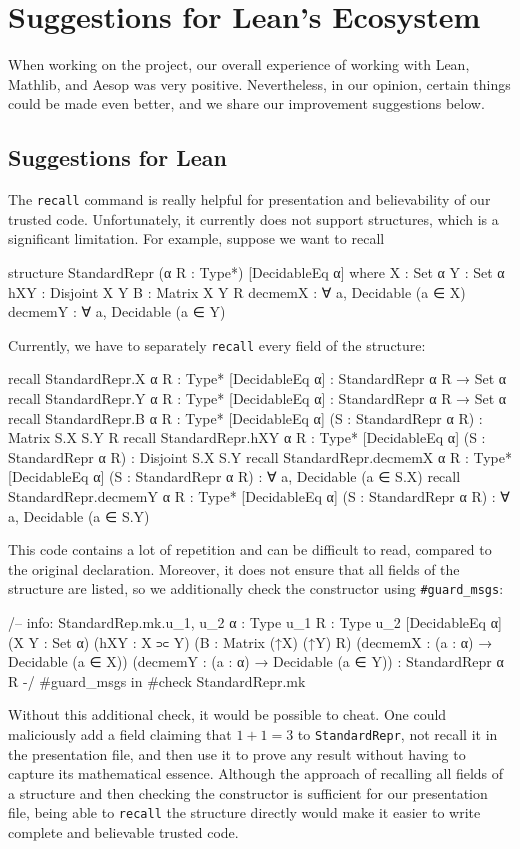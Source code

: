 \section{Suggestions for Lean's Ecosystem}

When working on the project, our overall experience of working with Lean, Mathlib, and Aesop was very positive. Nevertheless, in our opinion, certain things could be made even better, and we share our improvement suggestions below.

\subsection{Suggestions for Lean}

The \texttt{recall} command is really helpful for presentation and believability of our trusted code. Unfortunately, it currently does not support structures, which is a significant limitation. For example, suppose we want to recall
\begin{leancode}
structure StandardRepr (α R : Type*)
    [DecidableEq α] where
  X : Set α
  Y : Set α
  hXY : Disjoint X Y
  B : Matrix X Y R
  decmemX : ∀ a, Decidable (a ∈ X)
  decmemY : ∀ a, Decidable (a ∈ Y)
\end{leancode}
Currently, we have to separately \texttt{recall} every field of the structure:
\begin{leancode}
recall StandardRepr.X {α R : Type*}
  [DecidableEq α] :
  StandardRepr α R → Set α
recall StandardRepr.Y {α R : Type*}
  [DecidableEq α] :
  StandardRepr α R → Set α
recall StandardRepr.B {α R : Type*}
  [DecidableEq α] (S : StandardRepr α R) :
  Matrix S.X S.Y R
recall StandardRepr.hXY {α R : Type*}
  [DecidableEq α] (S : StandardRepr α R) :
  Disjoint S.X S.Y
recall StandardRepr.decmemX {α R : Type*}
  [DecidableEq α] (S : StandardRepr α R) :
  ∀ a, Decidable (a ∈ S.X)
recall StandardRepr.decmemY {α R : Type*}
  [DecidableEq α] (S : StandardRepr α R) :
  ∀ a, Decidable (a ∈ S.Y)
\end{leancode}
This code contains a lot of repetition and can be difficult to read, compared to the original declaration. Moreover, it does not ensure that all fields of the structure are listed, so we additionally check the constructor using \texttt{\#guard\_msgs}:
\begin{leancode}
/--
info: StandardRep.mk.{u_1, u_2}
  {α : Type u_1} {R : Type u_2} [DecidableEq α]
  (X Y : Set α) (hXY : X ⫗ Y)
  (B : Matrix (↑X) (↑Y) R)
  (decmemX : (a : α) → Decidable (a ∈ X))
  (decmemY : (a : α) → Decidable (a ∈ Y)) :
  StandardRepr α R
-/
#guard_msgs in
#check StandardRepr.mk
\end{leancode}
Without this additional check, it would be possible to cheat. One could maliciously add a field claiming that $1 + 1 = 3$ to \texttt{StandardRepr}, not recall it in the presentation file, and then use it to prove any result without having to capture its mathematical essence. Although the approach of recalling all fields of a structure and then checking the constructor is sufficient for our presentation file, being able to \texttt{recall} the structure directly would make it easier to write complete and believable trusted code.


